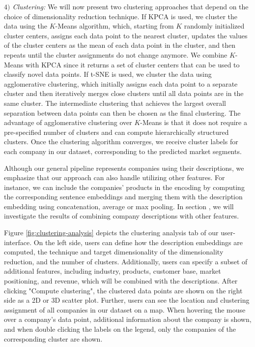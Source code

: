 \documentclass[conference]{IEEEtran}
\begin{document}
\textit{$4)$ Clustering:} We will now present two clustering approaches that depend on the choice of dimensionality reduction technique.
If KPCA is used, we cluster the data using the $K$-Means algorithm, which, starting from $K$ randomly initialized cluster centers, assigns each data point to the nearest cluster, updates the values of the cluster centers as the mean of each data point in the cluster, and then repeats until the cluster assignments do not change anymore. We combine $K$-Means with KPCA since it returns a set of cluster centers that can be used to classify novel data points. 
If t-SNE is used, we cluster the data using agglomerative clustering, which initially assigns each data point to a separate cluster and then iteratively merges close clusters until all data points are in the same cluster. The intermediate clustering that achieves the largest overall separation between data points can then be chosen as the final clustering. The advantage of agglomerative clustering over $K$-Means is that it does not require a pre-specified number of clusters and can compute hierarchically structured clusters.
Once the clustering algorithm converges, we receive cluster labels for each company in our dataset, corresponding to the predicted market segments.

Although our general pipeline represents companies using their descriptions, we emphasize that our approach can also handle utilizing other features. For instance, we can include the companies' products in the encoding by computing the corresponding sentence embeddings and merging them with the description embedding using concatenation, average or max pooling. In section \MakeUppercase{}, we will investigate the results of combining company descriptions with other features.

Figure \ref{fig:clustering-analysis} depicts the clustering analysis tab of our user-interface. On the left side, users can define how the description embeddings are computed, the technique and target dimensionality of the dimensionality reduction, and the number of clusters. Additionally, users can specify a subset of additional features, including industry, products, customer base, market positioning, and revenue, which will be combined with the descriptions. After clicking "Compute clustering", the clustered data points are shown on the right side as a 2D or 3D scatter plot. Further, users can see the location and clustering assignment of all companies in our dataset on a map. When hovering the mouse over a company's data point, additional information about the company is shown, and when double clicking the labels on the legend, only the companies of the corresponding cluster are shown.
\end{document}
